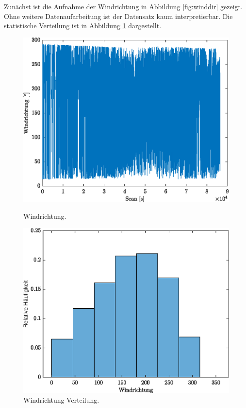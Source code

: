 Zunächst ist die Aufnahme der Windrichtung in Abbildung \ref{fig:winddir} gezeigt. Ohne weitere Datenaufarbeitung ist der Datensatz kaum interpretierbar. Die statistische Verteilung ist in Abbildung \ref{fig:winddirCN} dargestellt.
\begin{figure}[H]
	\centering
	\begin{minipage}[t]{0.45\textwidth}
		\centering
		\includegraphics[width=\textwidth]{../DATA/Windrichtung.eps}
		\caption[Windrichtung]{Windrichtung.}
		\label{fig:winddir}
	\end{minipage}
	\hfill
	\begin{minipage}[t]{0.45\textwidth}
		\centering
		\centering
		\includegraphics[width=\textwidth]{../DATA/WinddirCN.eps}
		\caption[Windrichtung Verteilung]{Windrichtung Verteilung.}
		\label{fig:winddirCN}
	\end{minipage}
\end{figure}

